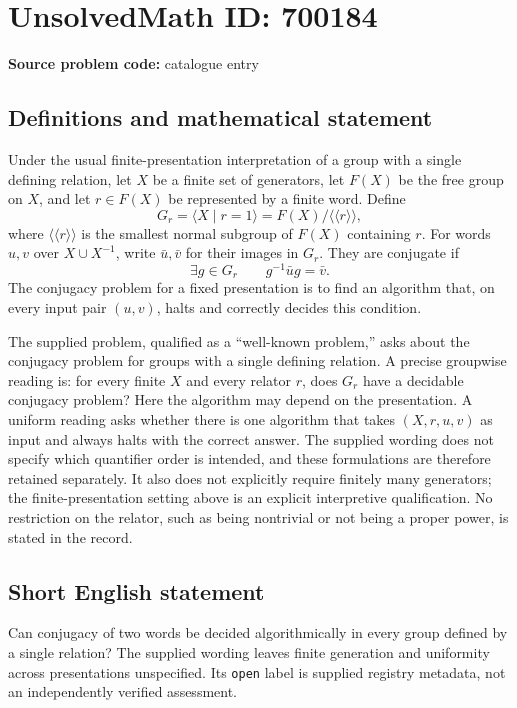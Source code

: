\documentclass[11pt]{article}
\begin{document}
\section*{UnsolvedMath ID: 700184}
\textbf{Source problem code:} catalogue entry
\subsection{Definitions and mathematical statement}
Under the usual finite-presentation interpretation of a group with a single defining relation, let \(X\) be a finite set of generators, let \(F(X)\) be the free group on \(X\), and let \(r\in F(X)\) be represented by a finite word. Define
\[
G_r=\langle X\mid r=1\rangle=F(X)/\langle\!\langle r\rangle\!\rangle,
\]
where \(\langle\!\langle r\rangle\!\rangle\) is the smallest normal subgroup of \(F(X)\) containing \(r\). For words \(u,v\) over \(X\cup X^{-1}\), write \(\bar u,\bar v\) for their images in \(G_r\). They are conjugate if
\[
\exists g\in G_r\qquad g^{-1}\bar u g=\bar v.
\]
The conjugacy problem for a fixed presentation is to find an algorithm that, on every input pair \((u,v)\), halts and correctly decides this condition.

The supplied problem, qualified as a ``well-known problem,'' asks about the conjugacy problem for groups with a single defining relation. A precise groupwise reading is: for every finite \(X\) and every relator \(r\), does \(G_r\) have a decidable conjugacy problem? Here the algorithm may depend on the presentation. A uniform reading asks whether there is one algorithm that takes \((X,r,u,v)\) as input and always halts with the correct answer. The supplied wording does not specify which quantifier order is intended, and these formulations are therefore retained separately. It also does not explicitly require finitely many generators; the finite-presentation setting above is an explicit interpretive qualification. No restriction on the relator, such as being nontrivial or not being a proper power, is stated in the record.
\subsection{Short English statement}
Can conjugacy of two words be decided algorithmically in every group defined by a single relation? The supplied wording leaves finite generation and uniformity across presentations unspecified. Its \texttt{open} label is supplied registry metadata, not an independently verified assessment.
\end{document}

